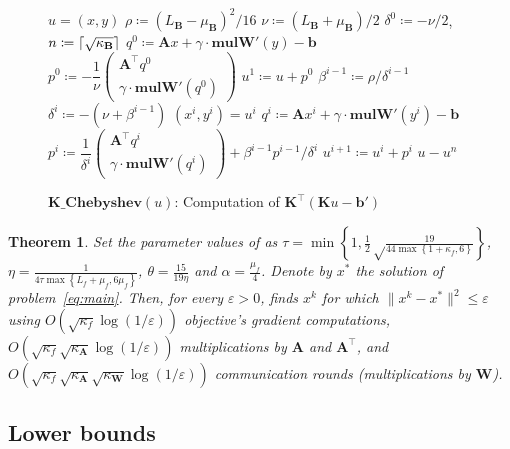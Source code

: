 \documentclass{article}
\DeclarePairedDelimiter\ceil{\lceil}{\rceil}
\newtheorem{theorem}{Theorem}
\newcommand{\R}{\mathbb{R}}
\newcommand{\norm}[1]{\|#1\|}
\newcommand{\sqn}[1]{\norm{#1}^2}
\newcommand{\sX}{\R^d}
\newcommand{\sY}{\R^m}
\newcommand{\mA}{\mathbf{A}}
\newcommand{\mB}{\mathbf{B}}
\newcommand{\mK}{\mathbf{K}}
\newcommand{\mW}{\mathbf{W}}
\newcommand{\pW}{\mathbf{W'}}
\newcommand{\mb}{\mathbf{b}}
\newcommand{\pb}{\mathbf{b'}}
\newcommand{\eqdef}{\coloneqq}
\newcommand{\mulpW}{\mathrm{\mathbf{mul}\pW}}
\newcommand{\Kcheb}{\mathrm{\mathbf{K\_Chebyshev}}}
\newcommand{\pmat}[1]{\begin{pmatrix}#1\end{pmatrix}}
\newcommand{\cbraces}[1]{\left( #1 \right)}
\newcommand{\braces}[1]{\left\{ #1 \right\}}
\newcommand{\eps}{\varepsilon}
\begin{document}
\begin{figure}[t!]
\begin{minipage}{.482\textwidth}
\end{minipage}\ \ \ \
\begin{minipage}{.482\textwidth}
    \vspace{0.2cm}
  \begin{algorithm}[H]
    \caption{$\Kcheb(u)$: Computation of $\mK^\top(\mK u - \pb)$}
  	\label{alg:Kcheb}
  	\begin{algorithmic}[1]
  		 $u = (x, y)$ %
      \State $\rho\eqdef \cbraces{{L_\mB}-{\mu_\mB}}^2/16$
      \State $\nu\eqdef\cbraces{{L_\mB}+{\mu_\mB}}/2$
  		\State $\delta^0 \eqdef -\nu/2$, \ $n \eqdef \ceil{\sqrt{\kappa_\mB}}$
      \State $q^0 \eqdef \mA x + \gamma \cdot\mulpW(y) -\mb$
      \State $p^0 \eqdef -\dfrac1\nu \pmat{\mA^\top  q^0 \\ \gamma \cdot \mulpW(q^0)}$
  		\State $u^1 \eqdef u + p^0$
  		\State $\beta^{i-1}\eqdef\rho/\delta^{i-1}$
  		\State $\delta^i\eqdef-(\nu+\beta^{i-1})$
      \State $(x^i, y^i) = u^i$
      \State $q^i \eqdef \mA x^i + \gamma \cdot\mulpW(y^i) -\mb$
      \State $p^i\eqdef \dfrac1{\delta^i}\pmat{\mA^\top  q^i \\ \gamma \cdot \mulpW(q^i)}+\beta^{i-1}p^{i-1}/\delta^i$
  		\State $u^{i+1}\eqdef u^i+p^i$
  		\EndFor
  	 $u - u^n$
  	\end{algorithmic}
  \end{algorithm}
\end{minipage}
\end{figure}

\begin{theorem}\label{thm:main} Set the parameter values of  as $\tau = \min\braces{1, \frac12\sqrt\frac{19}{44 \max\braces{1+\kappa_f, 6}}}$, $\eta= \frac1{4\tau \max\braces{L_f + \mu_f, 6\mu_f}}$, $\theta = \frac{15}{19\eta }$ and $\alpha = \frac{\mu_f}{4}$.
  Denote by $x^*$ the solution of problem~\eqref{eq:main}.
  Then, for every $\eps > 0$,  finds $x^k$ for which $\sqn{x^k - x^*} \leq \eps$ using $O(\sqrt{\kappa_f}\log(1/\eps))$ objective's gradient computations, $O(\sqrt{\kappa_f}\sqrt{\kappa_\mA}\log(1/\eps))$ multiplications by $\mA$ and $\mA^\top$, and $O(\sqrt{\kappa_f}\sqrt{\kappa_\mA}\sqrt{\kappa_\mW}\log(1/\eps))$ communication rounds (multiplications by $\mW$).
\end{theorem}

\subsection{Lower bounds}\label{subsec:lower_bounds}
\end{document}
